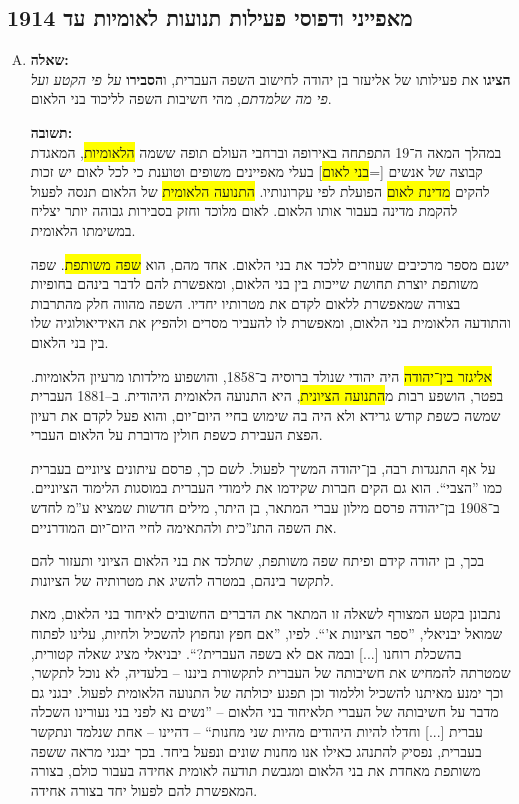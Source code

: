 \documentclass[a4paper]{article}
\newcommand\hl[1]   {\colorbox{yellow}{\!\!#1\!\!}}
\begin{document}
	\subsection{מאפייני ודפוסי פעילות תנועות לאומיות עד 1914}
		\begin{enumerate}[A.]
			\item \textbf{שאלה: }\\
			\textbf{הציגו} את פעילותו של אליעזר בן יהודה לחישוב השפה העברית, ו\textbf{הסבירו} \textit{על פי הקטע ועל פי מה שלמדתם}, מהי חשיבות השפה לליכוד בני הלאום. 
			
			\textbf{תשובה: }\\
			במהלך המאה ה־19 התפתחה באירופה וברחבי העולם תופה ששמה \hl{הלאומיות}, המאגדת קבוצה של אנשים [=\hl{בני לאום}] בעלי מאפיינים משופים וטוענת כי לכל לאום יש זכות להקים \hl{מדינת לאום} הפועלת לפי עקרונותיו. \hl{התנועה הלאומית} של הלאום תנסה לפעול להקמת מדינה בעבור אותו הלאום. לאום מלוכד וחזק בסבירות גבוהה יותר יצליח במשימתו הלאומית. 
			
			ישנם מספר מרכיבים שעוזרים ללכד את בני הלאום. אחד מהם, הוא \hl{שפה משותפת}. שפה משותפת יוצרת תחושת שייכות בין בני הלאום, ומאפשרת להם לדבר בינהם בחופיות בצורה שמאפשרת ללאום לקדם את מטרותיו יחדיו. השפה מהווה חלק מהתרבות והתודעה הלאומית בני הלאום, ומאפשרת לו להעביר מסרים ולהפיץ את האידיאולוגיה שלו בין בני הלאום. 
			
			\hl{אליגזר בין־יהודה} היה יהודי שנולד ברוסיה ב־1858, והושפוע מילדותו מרעיון הלאומיות. בפטר, הושפע רבות מ\hl{התנועה הציונית}, היא התנועה הלאומית היהודית. ב–1881 העברית שמשה כשפת קודש גרידא ולא היה בה שימוש בחיי היום־יום, והוא פעל לקדם את רעיון הפצת העבירת כשפת חולין מדוברת על הלאום העברי. 
			
			על אף התנגדות רבה, בן־יהודה המשיך לפעול. לשם כך, פרסם עיתונים ציוניים בעברית כמו ''הצבי``. הוא גם הקים חברות שקידמו את לימודי העברית במוסגות הלימוד הציוניים. ב־1908 בן־יהודה פרסם מילון עברי המתאר, בן היתר, מילים חדשות שמציא ע''מ לחדש את השפה התנ''כית ולהתאימה לחיי היום־יום המודרניים. 
			
			בכך, בן יהודה קידם ופיתח שפה משותפת, שתלכד את בני הלאום הציוני ותעזור להם לתקשר בינהם, במטרה להשיג את מטרותיה של הציונות. 
			
			נתבונן בקטע המצורף לשאלה זו המתאר את הדברים החשובים לאיחוד בני הלאום, מאת שמואל יבניאלי, ''ספר הציונות א'``. לפיו, ''אם חפץ ונחפוץ להשכיל ולחיות, עלינו לפתוח בהשכלת רוחנו [...] ובמה אם לא בשפה העברית?``. יבניאלי מציג שאלה קטורית, שמטרתה להמחיש את חשיבותה של העברית לתקשורת ביננו – בלעדיה, לא נוכל לתקשר, וכך ימנע מאיתנו להשכיל וללמוד וכן תפגע יכולתה של התנועה הלאומית לפעול. יבגני גם מדבר על חשיבותה של העברי תלאיחוד בני הלאום – ''נשים נא לפני בני נעורינו השכלה עברית [...] וחדלו להיות היהודים מהיות שני מחנות`` – דהיינו – אחת שנלמד ונתקשר בעברית, נפסיק להתנהג כאילו אנו מחנות שונים ונפעל ביחד. בכך יבגני מראה ששפה משותפת מאחדת את בני הלאום ומגבשת תודעה לאומית אחידה בעבור כולם, בצורה המאפשרת להם לפעול יחד בצורה אחידה. 
			

\end{enumerate}
\end{document}
